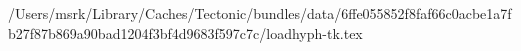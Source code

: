 /Users/msrk/Library/Caches/Tectonic/bundles/data/6ffe055852f8faf66c0acbe1a7fb27f87b869a90bad1204f3bf4d9683f597c7c/loadhyph-tk.tex